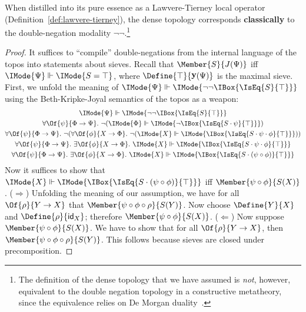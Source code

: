 \documentclass{article}
\DeclareMathOperator\OpYoneda{\mathbf{y}}
\newcommand\Yoneda[1]{\OpYoneda({#1})}
\newcommand\ArrId[1]{\mathsf{id}_{#1}}
\newcommand\Forces[2]{\IMode{#1}\Vdash\IMode{#2}}
\begin{document}
\begin{lem}[Aromatherapy]
  When distilled into its pure essence as a Lawvere-Tierney local
  operator (Definition~\ref{def:lawvere-tierney}), the dense topology
  corresponds \textbf{classically} to the double-negation modality
  $\lnot\lnot$.\footnote{The definition of the dense topology that we
    have assumed is \emph{not}, however, equivalent to the double
    negation topology in a constructive metatheory, since the
    equivalence relies on De Morgan
    duality~\cite{spitters:2010,coquand:2013}.}
\end{lem}
\begin{proof}
  It suffices to ``compile'' double-negations from the internal
  language of the topos into statements about sieves. Recall that
  $\Member{S}{J(\Psi)}$ iff $\Forces{\Psi}{S=\top}$, where
  $\Define{\top}{\Yoneda{\Psi}}$ is the maximal sieve. First, we
  unfold the meaning of
  $\Forces{\Psi}{\lnot\lnot\IBox{\IsEq{S}{\top}}}$ using the
  Beth-Kripke-Joyal semantics of the topos as a weapon:
  \begin{gather}
    \Forces{\Psi}{\lnot\lnot\IBox{\IsEq{S}{\top}}}
    \\
    \forall\Of{\psi}{\Phi\to\Psi}.\
    \lnot(\Forces{\Phi}{\lnot\IBox{\IsEq{S\cdot\psi}{\top}}})
    \\
    \forall\Of{\psi}{\Phi\to\Psi}.\
    \lnot(
      \forall\Of{\phi}{X\to\Phi}.\
      \lnot(\Forces{X}{\IBox{\IsEq{S\cdot\psi\cdot\phi}{\top}}})
    )
    \label{de-morgan-1}
    \\
    \forall\Of{\psi}{\Phi\to\Psi}.\
    \exists\Of{\phi}{X\to \Phi}.\
    \Forces{X}{\IBox{\IsEq{S\cdot\psi\cdot\phi}{\top}}}
    \label{de-morgan-2}
    \\
    \forall\Of{\psi}{\Phi\to\Psi}.\
    \exists\Of{\phi}{X\to \Phi}.\
    \Forces{X}{\IBox{\IsEq{S\cdot(\psi\circ\phi)}{\top}}}
  \end{gather}
  Now it suffices to show that
  $\Forces{X}{\IBox{\IsEq{S\cdot(\psi\circ\phi)}{\top}}}$ iff
  $\Member{\psi\circ\phi}{S(X)}$.
  ($\Rightarrow$) Unfolding the meaning of our assumption, we have for
  all $\Of{\rho}{Y\to X}$ that
  $\Member{\psi\circ\phi\circ\rho}{S(Y)}$. Now choose $\Define{Y}{X}$
  and $\Define{\rho}{\ArrId{X}}$; therefore
  $\Member{\psi\circ\phi}{S(X)}$.
  ($\Leftarrow$) Now suppose $\Member{\psi\circ\phi}{S(X)}$. We have
  to show that for all $\Of{\rho}{Y\to X}$, then
  $\Member{\psi\circ\phi\circ\rho}{S(Y)}$. This follows because sieves
  are closed under precomposition.
\end{proof}
\end{document}
